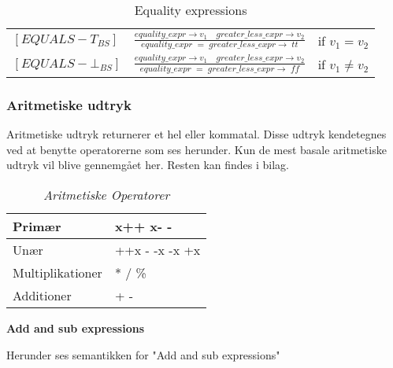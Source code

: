     \bgroup
    \def\arraystretch{3}
    \begin{table}[H]
    \centering
    \begin{tabular}{l c l}
        
        $[EQUALS-T_{BS}]$ &$\frac{equality\_expr \rightarrow v_1 \quad greater\_less\_expr \rightarrow v_2}{equality\_expr\;=\;greater\_less\_expr \rightarrow \; tt}$ & if $v_1 = v_2$ \\
        
        $[EQUALS-\bot_{BS}]$ &$\frac{equality\_expr \rightarrow v_1 \quad greater\_less\_expr \rightarrow v_2}{equality\_expr\;=\;greater\_less\_expr \rightarrow \; ff}$ & if $v_1 \ne v_2$ \\
        
    \end{tabular}
    \caption{Equality expressions}
    \label{tab:equalityExpr}
    \end{table}
    \egroup
\noindent \subsubsection{Aritmetiske udtryk}
Aritmetiske udtryk returnerer et hel eller kommatal. Disse udtryk kendetegnes ved at benytte operatorerne som ses herunder. Kun de mest basale aritmetiske udtryk vil blive gennemgået her. Resten kan findes i bilag.


\begin{table}[H]
    \centering
    \begin{tabular}{|l|l|}
        \hline
        \centering

        Primær             & x++ \quad x- -                                    \\ \hline
        Unær               & ++x \quad - -x \quad -x \quad +x                   \\ \hline
        Multiplikationer   & * \quad / \quad \%                                \\ \hline
        Additioner         & + \quad -                                         \\ \hline

    \end{tabular}
    \caption{\textit{Aritmetiske Operatorer}}
    \label{tab:aritmetiskeOperatorer}
\end{table}

\noindent \textbf{Add and sub expressions}
    
    \noindent Herunder ses semantikken for "Add and sub expressions"

